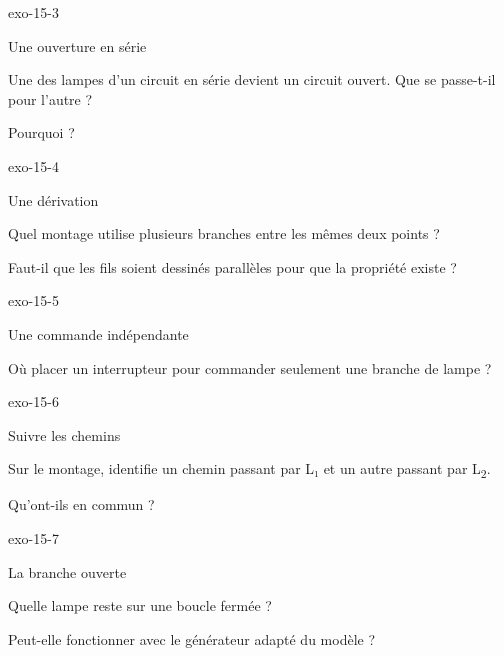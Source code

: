 \documentclass[12pt,twoside,openany]{book}
\begin{document}
\begin{blocLivre}{exo-15-3}
\begin{exercice}[1]{Une ouverture en série}
\begin{questions}
\item Une des lampes d’un circuit en série devient un circuit ouvert. Que se passe-t-il pour l’autre ?
\item Pourquoi ?
\end{questions}
\end{exercice}\end{blocLivre}
\begin{blocLivre}{exo-15-4}
\begin{exercice}[1]{Une dérivation}
\begin{questions}
\item Quel montage utilise plusieurs branches entre les mêmes deux points ?
\item Faut-il que les fils soient dessinés parallèles pour que la propriété existe ?
\end{questions}
\end{exercice}\end{blocLivre}
\begin{blocLivre}{exo-15-5}
\begin{exercice}[1]{Une commande indépendante}
\begin{questions}
\item Où placer un interrupteur pour commander seulement une branche de lampe ?
\end{questions}
\end{exercice}\end{blocLivre}
\begin{blocLivre}{exo-15-6}
\begin{exercice}[2]{Suivre les chemins}
\begin{questions}
\item Sur le montage, identifie un chemin passant par L₁ et un autre passant par L\textsubscript{2}.
\item Qu’ont-ils en commun ?
\end{questions}
\end{exercice}\end{blocLivre}
\begin{blocLivre}{exo-15-7}
\begin{exercice}[2]{La branche ouverte}
\begin{questions}
\item Quelle lampe reste sur une boucle fermée ?
\item Peut-elle fonctionner avec le générateur adapté du modèle ?
\end{questions}
\end{exercice}\end{blocLivre}
\end{document}
